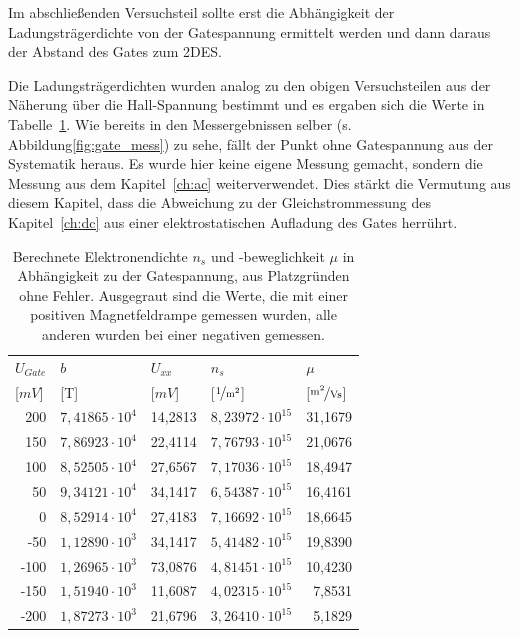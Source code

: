 
Im abschließenden Versuchsteil sollte erst die Abhängigkeit der Ladungsträgerdichte von der Gatespannung ermittelt werden und dann daraus der Abstand des Gates zum 2DES.

Die Ladungsträgerdichten wurden analog zu den obigen Versuchsteilen aus der Näherung über die Hall-Spannung bestimmt und es ergaben sich die Werte in Tabelle~\ref{tab:gate_ausw}. Wie bereits in den Messergebnissen selber (s. Abbildung\ref{fig:gate_mess}) zu sehe, fällt der Punkt ohne Gatespannung aus der Systematik heraus. Es wurde hier keine eigene Messung gemacht, sondern die Messung aus dem Kapitel~\ref{ch:ac} weiterverwendet. Dies stärkt die Vermutung aus diesem Kapitel, dass die Abweichung zu der Gleichstrommessung des Kapitel~\ref{ch:dc} aus einer elektrostatischen Aufladung des Gates herrührt.


\begin{table}[h]
	\centering
	\begin{tabular}{|r|r|l|r|r|}
		\hline
		\multicolumn{1}{|l|}{\cellcolor{black!30} $U_{Gate}$ } & \multicolumn{1}{|l|}{\cellcolor{black!30} $b$ } & \multicolumn{1}{|l|}{\cellcolor{black!30} $U_{xx}$ } & \multicolumn{1}{|l|}{\cellcolor{black!30} $n_s$ } & \multicolumn{1}{|l|}{\cellcolor{black!30} $\mu$ } \\
		\multicolumn{1}{|l|}{\cellcolor{black!30} [$\unit{mV}$] } &  \multicolumn{1}{|l|}{\cellcolor{black!30} [\unit{T}] } &
		\multicolumn{1}{|l|}{\cellcolor{black!30} [$\unit{mV}$] } &  \multicolumn{1}{|l|}{\cellcolor{black!30} [$\unitfrac{1}{m^2}$] } & \multicolumn{1}{|l|}{\cellcolor{black!30} [$\unitfrac{m^2}{Vs}$] } \\ \hline
200 & $ 7,41865\cdot 10^{4} $ & 14,2813 & $ 8,23972\cdot 10^{15} $ & 31,1679 \\
150 & $ 7,86923\cdot 10^{4} $ & 22,4114 & $ 7,76793\cdot 10^{15} $ & 21,0676 \\
100 & $ 8,52505\cdot 10^{4} $ & 27,6567 & $ 7,17036\cdot 10^{15} $ & 18,4947 \\
50 & $ 9,34121\cdot 10^{4} $ & 34,1417 & $ 6,54387\cdot 10^{15} $ & 16,4161 \\
0 & $ 8,52914\cdot 10^{4} $ & 27,4183 & $ 7,16692\cdot 10^{15} $ & 18,6645 \\
-50 & $ 1,12890\cdot 10^{3} $ & 34,1417 & $ 5,41482\cdot 10^{15} $ & 19,8390 \\
-100 & $ 1,26965\cdot 10^{3} $ & 73,0876 & $ 4,81451\cdot 10^{15} $ & 10,4230 \\
-150 & $ 1,51940\cdot 10^{3} $ & 11,6087 & $ 4,02315\cdot 10^{15} $ & 7,8531 \\
-200 & $ 1,87273\cdot 10^{3} $ & 21,6796 & $ 3,26410\cdot 10^{15} $ & 5,1829 \\ \hline
	\end{tabular}
	\caption{Berechnete Elektronendichte $n_s$ und -beweglichkeit $\mu$ in Abhängigkeit zu der Gatespannung, aus Platzgründen ohne Fehler. Ausgegraut sind die Werte, die mit einer positiven Magnetfeldrampe gemessen wurden, alle anderen wurden bei einer negativen gemessen.}
	\label{tab:gate_ausw}
\end{table}

